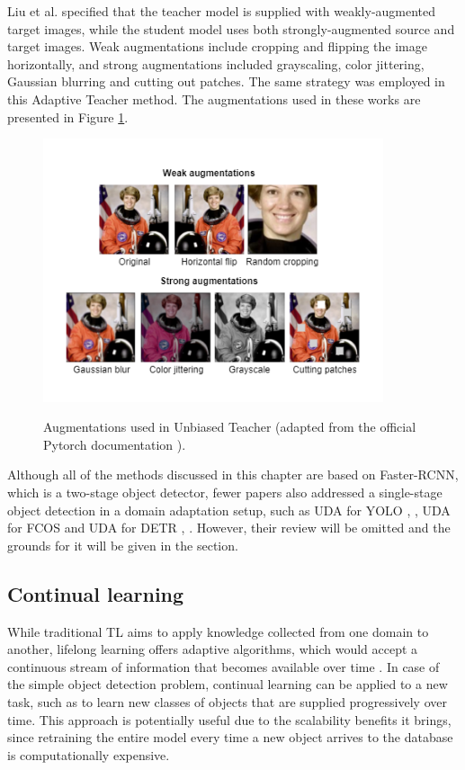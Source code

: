 Liu et al. \cite{Liu2021} specified that the teacher model is supplied with weakly-augmented target images, while the student model uses both strongly-augmented source and target images. Weak augmentations include cropping and flipping the image horizontally, and strong augmentations included grayscaling, color jittering, Gaussian blurring and cutting out patches. The same strategy was employed in this Adaptive Teacher method. The augmentations used in these works  \cite{Li2021, Liu2021} are presented in Figure \ref{augmentations}. 
\begin{figure}[htb]
	\begin{center}
		\includegraphics[width=10cm]{./augmentations.png}
	\end{center}
	\caption{Augmentations used in Unbiased Teacher (adapted from the official Pytorch documentation \cite{pytorch}).}
	\begin{center}
		\label{augmentations}
	\end{center}
\end{figure}


Although all of the methods discussed in this chapter are based on Faster-RCNN, which is a two-stage object detector, fewer papers also addressed a single-stage object detection in a domain adaptation setup, such as UDA for YOLO \cite{Hnewa2021}, \cite{Zhang2021a}, UDA for FCOS \cite{fcos1} and UDA for DETR \cite{Zhang2021b}, \cite{Vidit2021}. However, their review will be omitted and the grounds for it will be given in the  section. 
\FloatBarrier

\subsection{Continual learning}
\label{cont_learning} 
While traditional TL aims to apply knowledge collected from one domain to another, lifelong learning offers adaptive algorithms, which  would accept a continuous stream of information that becomes available over time \cite{Parisi2018}. In case of the simple object detection problem, continual learning can be applied to a new task, such as to learn new classes of objects that are supplied progressively over time. This approach is potentially useful due to the scalability benefits it brings, since retraining the entire model every time a new object arrives to the database is computationally expensive. 

